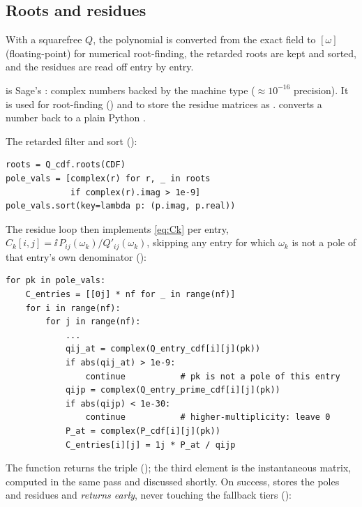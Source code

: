 \subsection{Roots and residues}

With a squarefree $Q$, the polynomial is converted from the exact field to
$[\omega]$ (floating-point) for numerical root-finding, the retarded roots
are kept and sorted, and the residues are read off entry by entry.

\begin{defn}
 is Sage's : complex numbers backed by
the machine  type ($\approx 10^{-16}$ precision). It is used for
root-finding () and to store the residue matrices as
.  converts a  number back
to a plain Python .
\end{defn}

The retarded filter and sort ():

\begin{lstlisting}
roots = Q_cdf.roots(CDF)
pole_vals = [complex(r) for r, _ in roots
             if complex(r).imag > 1e-9]
pole_vals.sort(key=lambda p: (p.imag, p.real))
\end{lstlisting}

The residue loop then implements \eqref{eq:Ck} per entry, $C_k[i,j] = \ii\,
P_{ij}(\omega_k)/Q'_{ij}(\omega_k)$, skipping any entry for which $\omega_k$ is
not a pole of that entry's own denominator ():

\begin{lstlisting}
for pk in pole_vals:
    C_entries = [[0j] * nf for _ in range(nf)]
    for i in range(nf):
        for j in range(nf):
            ...
            qij_at = complex(Q_entry_cdf[i][j](pk))
            if abs(qij_at) > 1e-9:
                continue           # pk is not a pole of this entry
            qijp = complex(Q_entry_prime_cdf[i][j](pk))
            if abs(qijp) < 1e-30:
                continue           # higher-multiplicity: leave 0
            P_at = complex(P_cdf[i][j](pk))
            C_entries[i][j] = 1j * P_at / qijp
\end{lstlisting}

The function returns the triple 
(); the third element is the instantaneous
matrix, computed in the same pass and discussed shortly. On success,
 stores the poles and residues and
\emph{returns early}, never touching the fallback tiers
():

